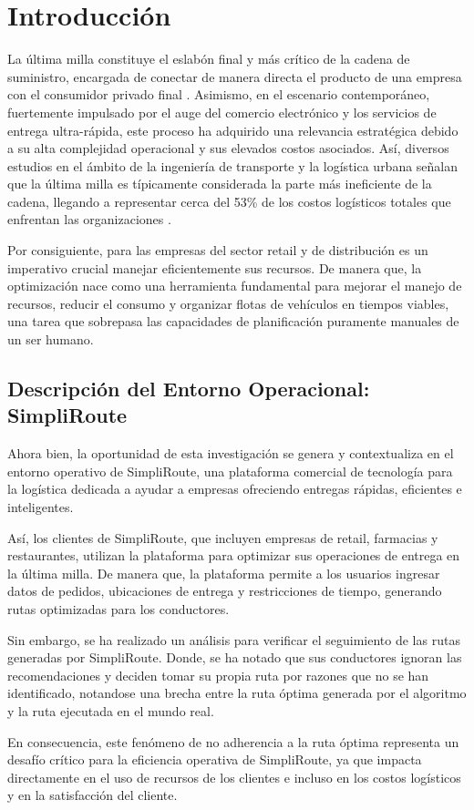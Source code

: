 \chapter{Introducción} %
\label{sec:Introduccion} %


La última milla constituye el eslabón final y más crítico de la cadena de suministro, encargada de conectar de manera directa el producto de una empresa con el consumidor privado final \cite{boysen2020last}. Asimismo, en el escenario contemporáneo, fuertemente impulsado por el auge del comercio electrónico y los servicios de entrega ultra-rápida, este proceso ha adquirido una relevancia estratégica debido a su alta complejidad operacional y sus elevados costos asociados. Así, diversos estudios en el ámbito de la ingeniería de transporte y la logística urbana señalan que la última milla es típicamente considerada la parte más ineficiente de la cadena, llegando a representar cerca del 53\% de los costos logísticos totales que enfrentan las organizaciones \cite{yadav2025assessing}. 

Por consiguiente, para las empresas del sector retail y de distribución es un imperativo crucial manejar eficientemente sus recursos. De manera que, la optimización nace como una herramienta fundamental para mejorar el manejo de recursos, reducir el consumo y organizar flotas de vehículos en tiempos viables, una tarea que sobrepasa las capacidades de planificación puramente manuales de un ser humano.

\section{Descripción del Entorno Operacional: SimpliRoute}
Ahora bien, la oportunidad de esta investigación se genera y contextualiza en el entorno operativo de SimpliRoute, una plataforma comercial de tecnología para la logística dedicada a ayudar a empresas ofreciendo entregas rápidas, eficientes e inteligentes.

Así, los clientes de SimpliRoute, que incluyen empresas de retail, farmacias y restaurantes, utilizan la plataforma para optimizar sus operaciones de entrega en la última milla. De manera que, la plataforma permite a los usuarios ingresar datos de pedidos, ubicaciones de entrega y restricciones de tiempo, generando rutas optimizadas para los conductores. 

Sin embargo, se ha realizado un análisis para verificar el seguimiento de las rutas generadas por SimpliRoute. Donde, se ha notado que sus conductores ignoran las recomendaciones y deciden tomar su propia ruta por razones que no se han identificado, notandose una brecha entre la ruta óptima generada por el algoritmo y la ruta ejecutada en el mundo real. 

En consecuencia, este fenómeno de no adherencia a la ruta óptima representa un desafío crítico para la eficiencia operativa de SimpliRoute, ya que impacta directamente en el uso de recursos de los clientes e incluso en los costos logísticos y en la satisfacción del cliente.

